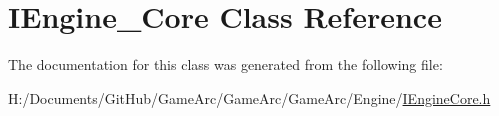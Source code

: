 \hypertarget{class_i_engine___core}{\section{I\+Engine\+\_\+\+Core Class Reference}
\label{class_i_engine___core}
}


The documentation for this class was generated from the following file\+:\begin{DoxyCompactItemize}
\item 
H\+:/\+Documents/\+Git\+Hub/\+Game\+Arc/\+Game\+Arc/\+Game\+Arc/\+Engine/\hyperlink{_i_engine_core_8h}{I\+Engine\+Core.\+h}\end{DoxyCompactItemize}
